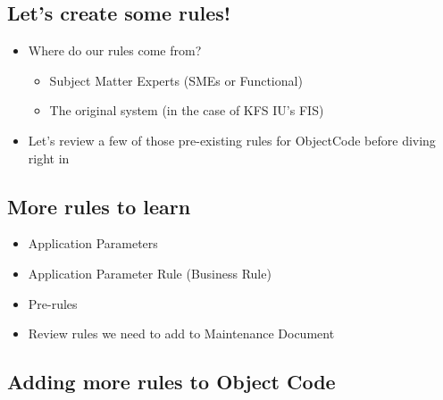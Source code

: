 \documentclass[12pt,notitlepage]{article}
\begin{document}
\begin{s5presentation}
\begin{s5slide}
  \W \end{s5slide}
  \W \begin{s5slide}
      \W \section{Let's create some rules!}
      \begin{ifhtml}
          \begin{itemize}
              \item Where do our rules come from?
              \begin{itemize}
                  \item Subject Matter Experts (SMEs or Functional)
                  \item The original system (in the case of KFS IU's FIS)
              \end{itemize}
              \item Let's review a few of those pre-existing rules for ObjectCode before diving right in
          \end{itemize}
      \end{ifhtml} 
  \W \end{s5slide}
  \W \begin{s5slide}
      \W \section{More rules to learn}
      \begin{ifhtml}
          \begin{itemize}
              \item Application Parameters
              \item Application Parameter Rule (Business Rule)
              \item Pre-rules
              \item Review rules we need to add to Maintenance Document
          \end{itemize}
      \end{ifhtml} 
  \W \end{s5slide}
  \W \begin{s5slide}
      \W \section{Adding more rules to Object Code}
      \begin{ifhtml}
          

\end{ifhtml}
\end{s5slide}
\end{s5presentation}
\end{document}
